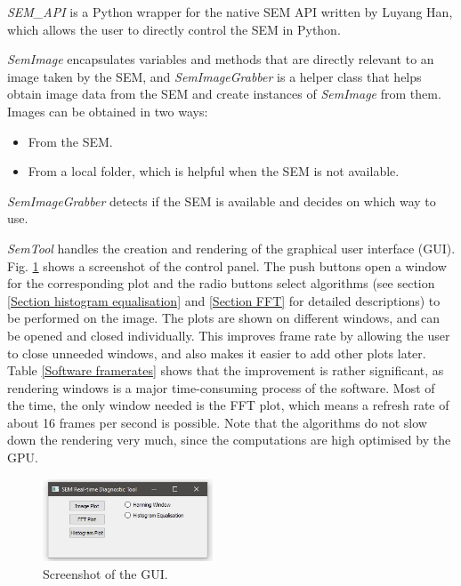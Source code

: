 \documentclass[12pt, conference]{IEEEtran}
\begin{document}
\textit{SEM\_API} is a Python wrapper for the native SEM API written by Luyang Han, which allows the user to directly control the SEM in Python.

\textit{SemImage} encapsulates variables and methods that are directly relevant to an image taken by the SEM, and \textit{SemImageGrabber} is a helper class that helps obtain image data from the SEM and create instances of \textit{SemImage} from them. Images can be obtained in two ways:
\begin{itemize}
    \item From the SEM.
    \item From a local folder, which is helpful when the SEM is not available.
\end{itemize}
\textit{SemImageGrabber} detects if the SEM is available and decides on which way to use.

\textit{SemTool} handles the creation and rendering of the graphical user interface (GUI). Fig. \ref{Software GUI} shows a screenshot of the control panel. The push buttons open a window for the corresponding plot and the radio buttons select algorithms (see section \ref{Section histogram equalisation} and \ref{Section FFT} for detailed descriptions) to be performed on the image. The plots are shown on different windows, and can be opened and closed individually. This improves frame rate by allowing the user to close unneeded windows, and also makes it easier to add other plots later. Table \ref{Software framerates} shows that the improvement is rather significant, as rendering windows is a major time-consuming process of the software. Most of the time, the only window needed is the FFT plot, which means a refresh rate of about 16 frames per second is possible. Note that the algorithms do not slow down the rendering very much, since the computations are high optimised by the GPU.

\begin{figure}[htbp]
    \centering
    \includegraphics[width=0.45\textwidth]{Images/Software screenshot.jpg}
    \caption{Screenshot of the GUI.}
    \label{Software GUI}
\end{figure}
\end{document}
